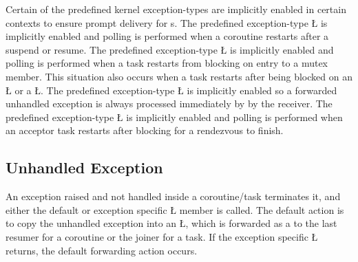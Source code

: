 \documentclass[openright,twoside]{report}
\begin{document}
Certain of the predefined kernel exception-types are implicitly enabled in certain contexts to ensure prompt delivery for s.
The predefined exception-type \LGinlinetrue\LGbegin\lgrinde\L{}\endlgrinde\LGend{} is implicitly enabled and polling is performed when a coroutine restarts after a suspend or resume.
The predefined exception-type \LGinlinetrue\LGbegin\lgrinde\L{}\endlgrinde\LGend{} is implicitly enabled and polling is performed when a task restarts from blocking on entry to a mutex member.
This situation also occurs when a task restarts after being blocked on an \LGinlinetrue\LGbegin\lgrinde\L{}\endlgrinde\LGend{} or a \LGinlinetrue\LGbegin\lgrinde\L{}\endlgrinde\LGend{}.
The predefined exception-type \LGinlinetrue\LGbegin\lgrinde\L{}\endlgrinde\LGend{} is implicitly enabled so a forwarded unhandled exception is always processed immediately by by the receiver.
The predefined exception-type \LGinlinetrue\LGbegin\lgrinde\L{}\endlgrinde\LGend{} is implicitly enabled and polling is performed when an acceptor task restarts after blocking for a rendezvous to finish.


\subsection{Unhandled Exception}
\label{s:UnhandledException}

An exception raised and not handled inside a coroutine/task terminates it, and either the default or exception specific \LGinlinetrue\LGbegin\lgrinde\L{}\endlgrinde\LGend{} member is called.
The default action is to copy the unhandled exception into an \LGinlinetrue\LGbegin\lgrinde\L{}\endlgrinde\LGend{}, which is forwarded as a  to the last resumer for a coroutine or the joiner for a task.
If the exception specific \LGinlinetrue\LGbegin\lgrinde\L{}\endlgrinde\LGend{} returns, the default forwarding action occurs.
\end{document}
